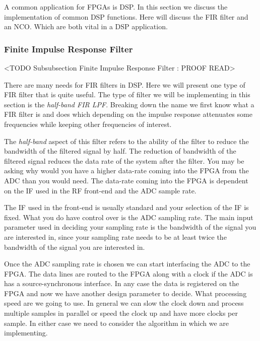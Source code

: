 A common application for \ac{FPGA}s is \ac{DSP}. In this section we discuss the implementation of common \ac{DSP} functions. Here will discuss the \ac{FIR} filter and an \ac{NCO}. Which are both vital in a \ac{DSP} application. 

\subsubsection{Finite Impulse Response Filter}
	<TODO Subsubsection  Finite Impulse Response Filter : PROOF READ>

There are many needs for \ac{FIR} filters in \ac{DSP}. Here we will present one type of \ac{FIR} filter that is quite useful. The type of filter we will be implementing in this section is the \emph{half-band \ac{FIR} \ac{LPF}}. Breaking down the name we first know what a \ac{FIR} filter is and does which depending on the impulse response attenuates some frequencies while keeping other frequencies of interest. 

The \emph{half-band} aspect of this filter refers to the ability of the filter to reduce the bandwidth of the filtered signal by half. The reduction of bandwidth of the filtered signal reduces the data rate of the system after the filter. You may be asking why would you have a higher data-rate coming into the \ac{FPGA} from the \ac{ADC} than you would need. The data-rate coming into the \ac{FPGA} is dependent on the \ac{IF} used in the \ac{RF} front-end and the \ac{ADC} sample rate. 

The \ac{IF} used in the front-end is usually standard and your selection of the \ac{IF} is fixed. What you do have control over is the \ac{ADC} sampling rate. The main input parameter used in deciding your sampling rate is the bandwidth of the signal you are interested in, since your sampling rate needs to be at least twice the bandwidth of the signal you are interested in. 

Once the \ac{ADC} sampling rate is chosen we can start interfacing the \ac{ADC} to the \ac{FPGA}. The data lines are routed to the \ac{FPGA} along with a clock if the \ac{ADC} is has a source-synchronous interface. In any case the data is registered on the \ac{FPGA} and now we have another design parameter to decide. What processing speed are we going to use. In general we can slow the clock down and process multiple samples in parallel or speed the clock up and have more clocks per sample. In either case we need to consider the algorithm in which we are implementing. 

